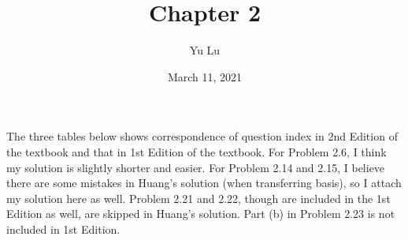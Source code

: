 \documentclass{article}
\title{Chapter 2}
\date{March 11, 2021}
\author{Yu Lu}
\begin{document}
\newcommand{\pz}{\ket{\vb{+z}}}
\newcommand{\nz}{\ket{\vb{-z}}}
\newcommand{\px}{\ket{\vb{+x}}}
\newcommand{\nx}{\ket{\vb{-x}}}
\newcommand{\py}{\ket{\vb{+y}}}
\newcommand{\ny}{\ket{\vb{-y}}}

\newcommand{\pxexpr}{ \frac{1}{\sqrt{2}} \pz + \frac{1}{\sqrt{2}} \nz}
\newcommand{\nxexpr}{ \frac{1}{\sqrt{2}} \pz - \frac{1}{\sqrt{2}} \nz}
\newcommand{\pyexpr}{ \frac{1}{\sqrt{2}} \pz + \frac{i}{\sqrt{2}} \nz}
\newcommand{\nyexpr}{ \frac{1}{\sqrt{2}} \pz - \frac{i}{\sqrt{2}} \nz}
\newcommand{\rot}[1]{\hat{R}(\phi \hat{#1})} %
\newcommand{\rott}[2]{\hat{R}(#1 \hat{#2})} %
\newcommand{\sm}[4]{\pmqty{\braket{#1}{#3}& \braket{#1}{#4} \\ \braket{#2}{#3} & \braket{#2}{#4}}} %
\newcommand{\basexp}[1]{\xrightarrow{\ket{#1}}} %
    \maketitle
    The three tables below shows correspondence of question index in 2nd Edition of the textbook and that in 1st Edition of the textbook. For Problem 2.6, I think my solution is slightly shorter and easier. For Problem 2.14 and 2.15, I believe there are some mistakes in Huang's solution (when transferring basis), so I attach my solution here as well. Problem 2.21 and 2.22, though are included in the 1st Edition as well, are skipped in Huang's solution. Part (b) in Problem 2.23 is not included in 1st Edition. 
    
\end{document}
